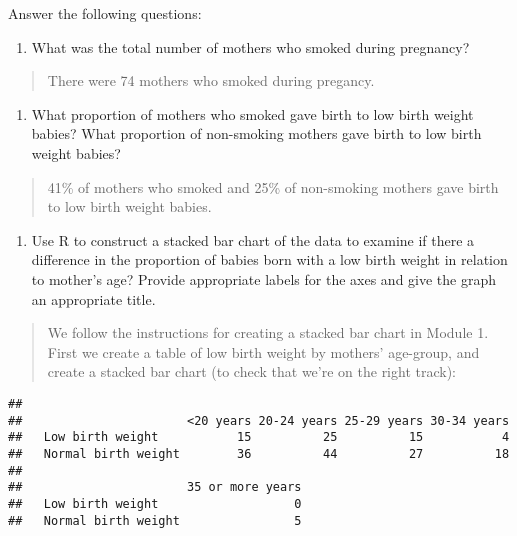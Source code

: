\documentclass[
]{memoir}
\newenvironment{Shaded}{\begin{snugshade}}{\end{snugshade}}
\newcommand{\FunctionTok}[1]{\textcolor[rgb]{0.00,0.00,0.00}{#1}}
\newcommand{\NormalTok}[1]{#1}
\newcommand{\OtherTok}[1]{\textcolor[rgb]{0.56,0.35,0.01}{#1}}
\newcommand{\SpecialCharTok}[1]{\textcolor[rgb]{0.00,0.00,0.00}{#1}}
\providecommand{\tightlist}{%
  \setlength{\itemsep}{0pt}\setlength{\parskip}{0pt}}
\begin{document}
Answer the following questions:

\begin{enumerate}
\def\labelenumi{\alph{enumi})}
\tightlist
\item
  What was the total number of mothers who smoked during pregnancy?
\end{enumerate}

\begin{quote}
There were 74 mothers who smoked during pregancy.
\end{quote}

\begin{enumerate}
\def\labelenumi{\alph{enumi})}
\setcounter{enumi}{1}
\tightlist
\item
  What proportion of mothers who smoked gave birth to low birth weight babies? What proportion of non-smoking mothers gave birth to low birth weight babies?
\end{enumerate}

\begin{quote}
41\% of mothers who smoked and 25\% of non-smoking mothers gave birth to low birth weight babies.
\end{quote}

\begin{enumerate}
\def\labelenumi{\alph{enumi})}
\setcounter{enumi}{2}
\tightlist
\item
  Use R to construct a stacked bar chart of the data to examine if there a difference in the proportion of babies born with a low birth weight in relation to mother's age? Provide appropriate labels for the axes and give the graph an appropriate title.
\end{enumerate}

\begin{quote}
We follow the instructions for creating a stacked bar chart in Module 1. First we create a table of low birth weight by mothers' age-group, and create a stacked bar chart (to check that we're on the right track):
\end{quote}

\begin{Shaded}
\end{Shaded}

\begin{verbatim}
##                      
##                       <20 years 20-24 years 25-29 years 30-34 years
##   Low birth weight           15          25          15           4
##   Normal birth weight        36          44          27          18
##                      
##                       35 or more years
##   Low birth weight                   0
##   Normal birth weight                5
\end{verbatim}
\end{document}
